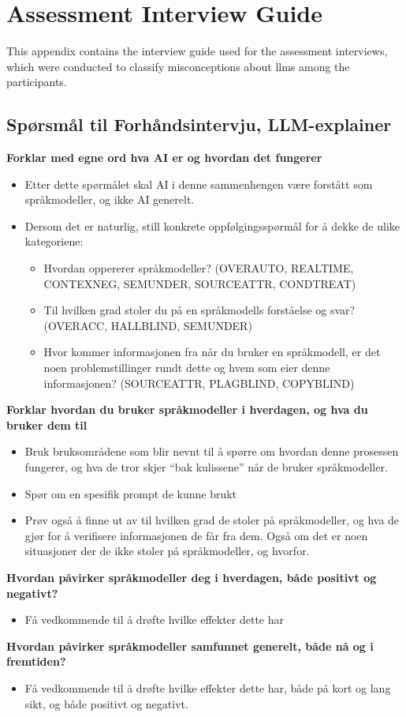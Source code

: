 \chapter{Assessment Interview Guide}\label{interview_guide}

This appendix contains the interview guide used for the assessment interviews, which were conducted to classify misconceptions about \gls{llms} among the participants.

\section*{Spørsmål til Forhåndsintervju, LLM-explainer}

\textbf{Forklar med egne ord hva AI er og hvordan det fungerer}
\begin{itemize}
\item Etter dette spørmålet skal AI i denne sammenhengen være forstått som språkmodeller, og ikke AI generelt.
\item Dersom det er naturlig, still konkrete oppfølgingsspørmål for å dekke de ulike kategoriene:
	\begin{itemize}
	\item Hvordan oppererer språkmodeller? (OVERAUTO, REALTIME, CONTEXNEG, SEMUNDER, SOURCEATTR, CONDTREAT)
	\item Til hvilken grad stoler du på en språkmodells forståelse og svar? (OVERACC, HALLBLIND, SEMUNDER)
	\item Hvor kommer informasjonen fra når du bruker en språkmodell, er det noen problemstillinger rundt dette og hvem som eier denne informasjonen? (SOURCEATTR, PLAGBLIND, COPYBLIND)
	\end{itemize}
\end{itemize}

\textbf{Forklar hvordan du bruker språkmodeller i hverdagen, og hva du bruker dem til}
\begin{itemize}
\item Bruk bruksområdene som blir nevnt til å spørre om hvordan denne prosessen fungerer, og hva de tror skjer ``bak kulissene'' når de bruker språkmodeller.
\item Spør om en spesifik prompt de kunne brukt
\item Prøv også å finne ut av til hvilken grad de stoler på språkmodeller, og hva de gjør for å verifisere informasjonen de får fra dem. Også om det er noen situasjoner der de ikke stoler på språkmodeller, og hvorfor.
\end{itemize}

\textbf{Hvordan påvirker språkmodeller deg i hverdagen, både positivt og negativt?}
\begin{itemize}
\item Få vedkommende til å drøfte hvilke effekter dette har
\end{itemize}

\textbf{Hvordan påvirker språkmodeller samfunnet generelt, både nå og i fremtiden?}
\begin{itemize}
\item Få vedkommende til å drøfte hvilke effekter dette har, både på kort og lang sikt, og både positivt og negativt.
\end{itemize}
